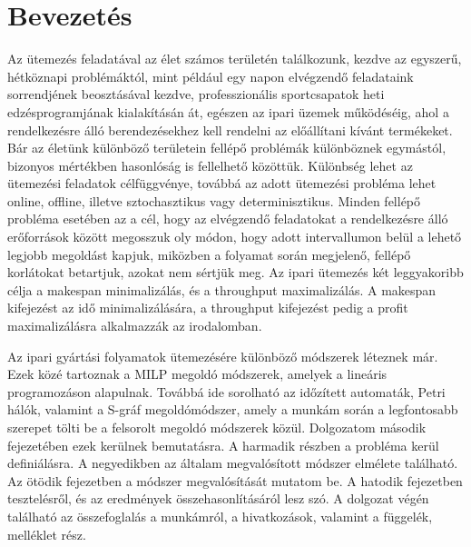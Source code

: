 \chapter{Bevezetés}
Az ütemezés feladatával az élet számos területén találkozunk, kezdve az egyszerű, hétköznapi problémáktól, mint például egy napon elvégzendő feladataink sorrendjének beosztásával kezdve, professzionális sportcsapatok heti edzésprogramjának kialakításán át, egészen az ipari üzemek működéséig, ahol a rendelkezésre álló berendezésekhez kell rendelni az előállítani kívánt termékeket. Bár az életünk különböző területein fellépő problémák különböznek egymástól, bizonyos mértékben hasonlóság is fellelhető közöttük. Különbség lehet az ütemezési feladatok célfüggvénye, továbbá az adott ütemezési probléma lehet online, offline, illetve sztochasztikus vagy determinisztikus. Minden fellépő probléma esetében az a cél, hogy az elvégzendő feladatokat a rendelkezésre álló erőforrások között megosszuk oly módon, hogy adott intervallumon belül a lehető legjobb megoldást kapjuk, miközben a folyamat során megjelenő, fellépő korlátokat betartjuk, azokat nem sértjük meg. Az ipari ütemezés két leggyakoribb célja a makespan minimalizálás, és a throughput maximalizálás. A makespan kifejezést az idő minimalizálására, a throughput kifejezést pedig a profit maximalizálásra alkalmazzák az irodalomban.

Az ipari gyártási folyamatok ütemezésére különböző módszerek léteznek már. Ezek közé tartoznak a MILP megoldó módszerek, amelyek a lineáris programozáson alapulnak. Továbbá ide sorolható az időzített automaták, Petri hálók, valamint a S-gráf megoldómódszer, amely a munkám során a legfontosabb szerepet tölti be a felsorolt megoldó módszerek közül. Dolgozatom második fejezetében ezek kerülnek bemutatásra. A harmadik részben a probléma kerül definiálásra. A negyedikben az általam megvalósított módszer elmélete található. Az ötödik fejezetben a módszer megvalósítását mutatom be. A hatodik fejezetben tesztelésről, és az eredmények összehasonlításáról lesz szó. A dolgozat végén található az összefoglalás a munkámról, a hivatkozások, valamint a függelék, melléklet rész.